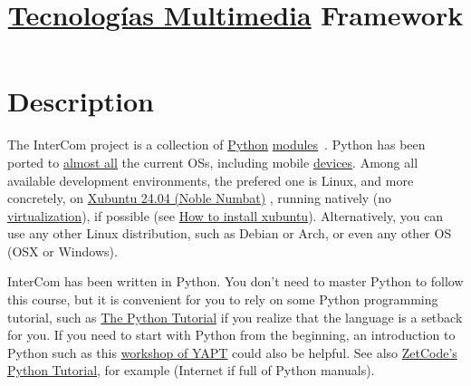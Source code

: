 
\title{\href{https://tecnologias-multimedia.github.io/}{Tecnologías Multimedia} \newline Framework}

\maketitle
\tableofcontents

\section{Description}

The InterCom project \cite{intercom} is a collection of
\href{https://www.python.org/}{Python}
\href{https://docs.python.org/3/tutorial/modules.html#modules}{modules}~\cite{python}.
Python has been ported to
\href{https://www.python.org/download/other/}{almost all} the current
OSs, including mobile \href{https://kivy.org/#home}{devices}. Among
all available development environments, the prefered one is Linux, and
more concretely, on \href{https://xubuntu.org/download/}{Xubuntu 24.04
  (Noble Numbat)} \cite{xubuntu}, running natively (no
\href{https://en.wikipedia.org/wiki/Virtualization}{virtualization}),
if possible (see
\href{https://vicente-gonzalez-ruiz.github.io/Xubuntu_install/}{How to
  install xubuntu}). Alternatively, you can use any other Linux
distribution, such as Debian or Arch, or even any other OS (OSX or
Windows).

InterCom has been written in Python. You don't need to master Python
to follow this course, but it is convenient for you to rely on some
Python programming tutorial, such as
\href{https://docs.python.org/3/tutorial/}{The Python Tutorial}
\cite{python-tutorial} if you realize that the language is a setback
for you. If you need to start with Python from the beginning, an
introduction to Python such as this
\href{https://github.com/vicente-gonzalez-ruiz/YAPT/tree/master/workshops/programacion_python_ESO}{workshop
  of YAPT} \cite{YAPT} could also be helpful. See also
\href{http://zetcode.com/lang/python/}{ZetCode's Python Tutorial}, for
example (Internet if full of Python manuals).

